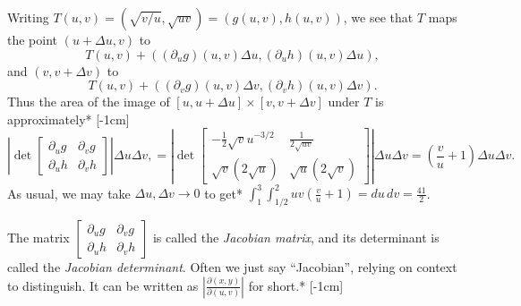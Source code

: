 \documentclass[svgnames]{report}
\begin{document}
\begin{solution}
  Writing $T(u,v) =
  (\sqrt{v/u}, \sqrt{uv}) = (g(u,v), h(u,v))$, we see that $T$ maps
  the point $(u+\Delta u, v)$ to
  \begin{equation} \label{eq:Tv}
    T(u,v) + ((\partial_u g)(u,v) \Delta u,
    (\partial_u h)(u,v) \Delta u), 
  \end{equation}
  and
  $(v, v+\Delta v)$ to
  \begin{equation} \label{eq:Tu}
    T(u,v) + ((\partial_v g)(u,v) \Delta v,
    (\partial_v h)(u,v) \Delta v). 
  \end{equation}
  Thus the area of the image of $[u, u+\Delta u] \times [v, v + \Delta
  v]$ under $T$ is approximately* [-1cm]
  \[
    \left| \det \left[
      \begin{array}{cc}
        \partial_u g & \partial _v g \\
        \partial_u h & \partial _v h
      \end{array} \right]
    \right| \Delta u \Delta v,  =
    \left| \det \left[
      \begin{array}{cc}
        -\frac{1}{2}\sqrt{v}u^{-3/2} & \frac{1}{2\sqrt{uv}} \\
        \sqrt{v}(2\sqrt{u}) & \sqrt{u}(2\sqrt{v})
      \end{array} \right]
      \right| \Delta u \Delta v  = \left(\frac{v}{u} + 1\right)
      \Delta u \Delta v. 
    \]
    As usual, we may take $\Delta u, \Delta v \to 0$ to get*
    $\displaystyle{\int_{1}^{3}\int_{1/2}^{2}uv \left(\frac{v}{u} + 1\right) = 
    du \, dv = \boxed{\frac{41}{2}}}$. 
  \end{solution}

  The matrix $\left[
      \begin{array}{cc}
        \partial_u g & \partial _v g \\
        \partial_u h & \partial _v h
      \end{array} \right]$ is called the \textit{Jacobian matrix}, and
    its determinant is called the \textit{Jacobian determinant}. Often we just say
    ``Jacobian'', relying on context to distinguish. It can be written
    as $\left|\frac{\partial (x,y)}{\partial (u,v)} \right|$ for
    short.* [-1cm]
    
\end{document}
